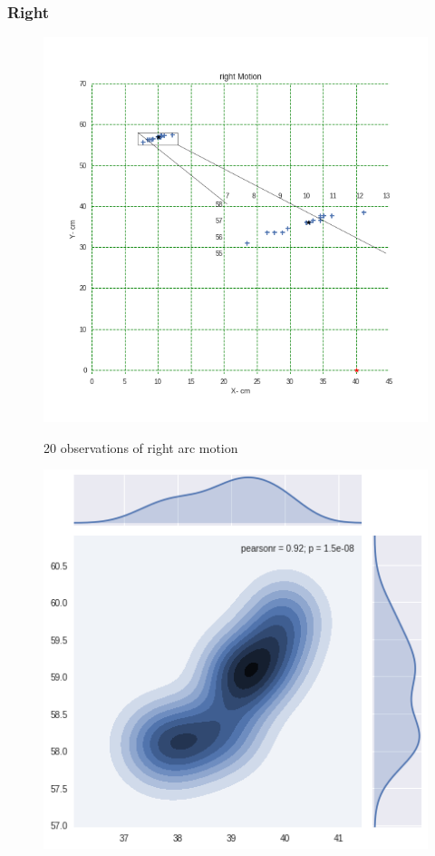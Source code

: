 \documentclass[11pt,a4paper,titlepage]{article}
\begin{document}
\begin{itemize}
\subsubsection{Right}
\begin{figure}[H]
	\centering	
		\includegraphics[width=1.2\linewidth]{right}
		\label{fig:sub1}
	\caption{20 observations of right arc motion}
  \end{figure}
    \begin{figure}[H]
	\centering	
		\includegraphics[width=0.8\linewidth]{rightG}

\end{figure}
\end{itemize}
\end{document}
